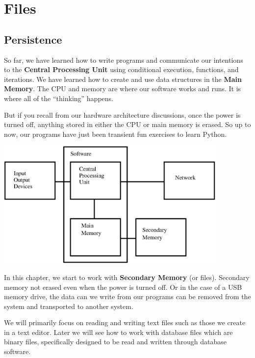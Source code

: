 \documentclass[10pt]{book}
\begin{document}
\chapter{Files}



\section{Persistence}


So far, we have learned how to write programs and communicate 
our intentions to the {\bf Central Processing Unit} using conditional
execution, functions, and iterations.  We have learned how to 
create and use data structures in the {\bf Main Memory}.  The CPU 
and memory are where our software works and runs.  It is where 
all of the ``thinking'' happens.  

But if you recall from our hardware architecture discussions,
once the power is turned off, anything stored in either
the CPU or main memory is erased.  So up to now, our
programs have just been transient fun exercises to learn Python.

\beforefig
\centerline{\includegraphics[height=2.50in]{figs2/arch3.eps}}
\afterfig

In this chapter, we start to work with {\bf Secondary Memory} 
(or files).
Secondary memory not erased even when the power is turned off.  
Or in the case of a USB memory drive, the
data can we write from our programs can be removed from the 
system and transported to another system.

We will primarily focus on reading and writing text files such as 
those we create in a text editor.  Later we will see how to work
with database files which are binary files, specifically designed to be read
and written through database software.
\end{document}
